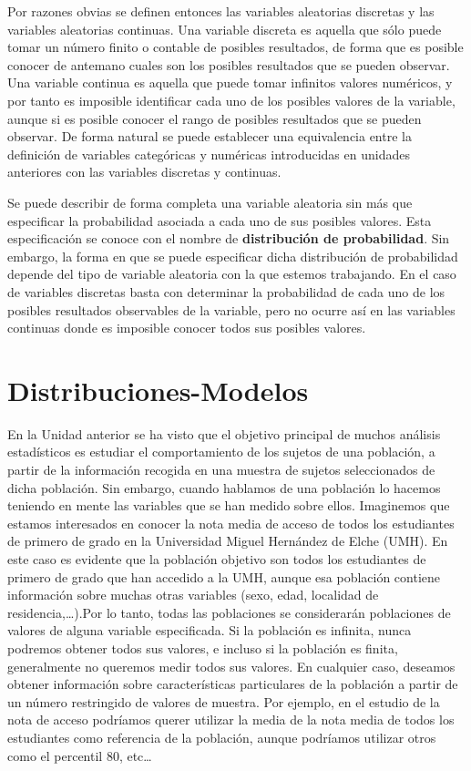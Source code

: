 \documentclass[
]{book}
\begin{document}
Por razones obvias se definen entonces las variables aleatorias discretas y las variables aleatorias continuas. Una variable discreta es aquella que sólo puede tomar un número finito o contable de posibles resultados, de forma que es posible conocer de antemano cuales son los posibles resultados que se pueden observar. Una variable continua es aquella que puede tomar infinitos valores numéricos, y por tanto es imposible identificar cada uno de los posibles valores de la variable, aunque si es posible conocer el rango de posibles resultados que se pueden observar. De forma natural se puede establecer una equivalencia entre la definición de variables categóricas y numéricas introducidas en unidades anteriores con las variables discretas y continuas.

Se puede describir de forma completa una variable aleatoria sin más que especificar la probabilidad asociada a cada uno de sus posibles valores. Esta especificación se conoce con el nombre de \textbf{distribución de probabilidad}. Sin embargo, la forma en que se puede especificar dicha distribución de probabilidad depende del tipo de variable aleatoria con la que estemos trabajando. En el caso de variables discretas basta con determinar la probabilidad de cada uno de los posibles resultados observables de la variable, pero no ocurre así en las variables continuas donde es imposible conocer todos sus posibles valores.

\hypertarget{distribuciones-modelos}{%
\section{Distribuciones-Modelos}\label{distribuciones-modelos}}

En la Unidad anterior se ha visto que el objetivo principal de muchos análisis estadísticos es estudiar el comportamiento de los sujetos de una población, a partir de la información recogida en una muestra de sujetos seleccionados de dicha población. Sin embargo, cuando hablamos de una población lo hacemos teniendo en mente las variables que se han medido sobre ellos. Imaginemos que estamos interesados en conocer la nota media de acceso de todos los estudiantes de primero de grado en la Universidad Miguel Hernández de Elche (UMH). En este caso es evidente que la población objetivo son todos los estudiantes de primero de grado que han accedido a la UMH, aunque esa población contiene información sobre muchas otras variables (sexo, edad, localidad de residencia,\ldots).Por lo tanto, todas las poblaciones se considerarán poblaciones de valores de alguna variable especificada. Si la población es infinita, nunca podremos obtener todos sus valores, e incluso si la población es finita, generalmente no queremos medir todos sus valores. En cualquier caso, deseamos obtener información sobre características particulares de la población a partir de un número restringido de valores de muestra. Por ejemplo, en el estudio de la nota de acceso podríamos querer utilizar la media de la nota media de todos los estudiantes como referencia de la población, aunque podríamos utilizar otros como el percentil 80, etc\ldots{}
\end{document}
